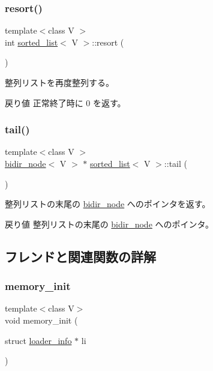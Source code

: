 \subsubsection{\texorpdfstring{resort()}{resort()}}
{\footnotesize\ttfamily template$<$class V $>$ \\
int \hyperlink{classsorted__list}{sorted\+\_\+list}$<$ V $>$\+::resort (\begin{DoxyParamCaption}{ }\end{DoxyParamCaption})}

整列リストを再度整列する。 \begin{DoxyReturn}{戻り値}
正常終了時に 0 を返す。 
\end{DoxyReturn}
\hypertarget{classsorted__list_ac89adea8f09aa4ee809e06f90c55b2b8}{}\label{classsorted__list_ac89adea8f09aa4ee809e06f90c55b2b8} 
\subsubsection{\texorpdfstring{tail()}{tail()}}
{\footnotesize\ttfamily template$<$class V $>$ \\
\hyperlink{classbidir__node}{bidir\+\_\+node}$<$ V $>$ $\ast$ \hyperlink{classsorted__list}{sorted\+\_\+list}$<$ V $>$\+::tail (\begin{DoxyParamCaption}{ }\end{DoxyParamCaption})}

整列リストの末尾の \hyperlink{classbidir__node}{bidir\+\_\+node} へのポインタを返す。 \begin{DoxyReturn}{戻り値}
整列リストの末尾の \hyperlink{classbidir__node}{bidir\+\_\+node} へのポインタ。 
\end{DoxyReturn}


\subsection{フレンドと関連関数の詳解}
\hypertarget{classsorted__list_a8840f01b46a3b9c43a461591a579c1bd}{}\label{classsorted__list_a8840f01b46a3b9c43a461591a579c1bd} 
\subsubsection{\texorpdfstring{memory\+\_\+init}{memory\_init}}
{\footnotesize\ttfamily template$<$class V$>$ \\
void memory\+\_\+init (\begin{DoxyParamCaption}\item[{struct \hyperlink{structloader__info}{loader\+\_\+info} $\ast$}]{li }\end{DoxyParamCaption})\hspace{0.3cm}{\ttfamily [friend]}}

